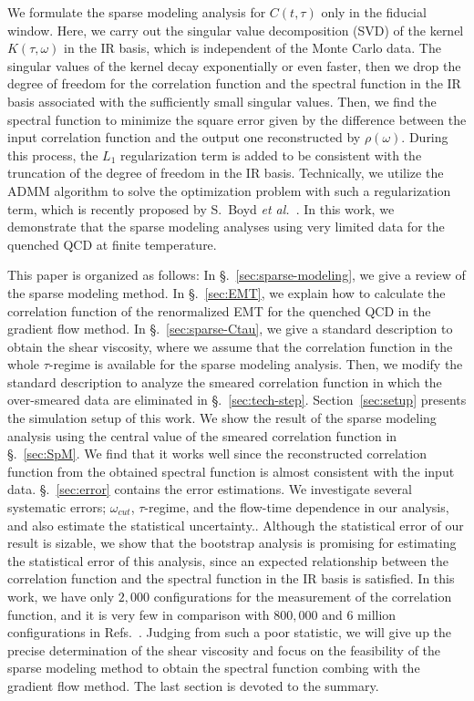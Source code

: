 \documentclass[a4paper,11pt]{article}
\begin{document}
We formulate the sparse modeling analysis for $C(t,\tau)$ only in the fiducial window.  
Here, we carry out  the singular value decomposition (SVD) of the kernel $K(\tau,\omega)$ in the IR basis, which is independent of the Monte Carlo data.
The singular values of the kernel decay exponentially or even faster, then we drop the degree of freedom for the correlation function and the spectral function in the IR basis associated with the sufficiently small singular values.
Then, we find the spectral function to minimize the square error given by the difference between the input correlation function and the output one reconstructed by $\rho(\omega)$.
During this process, the $L_1$ regularization term is added to be consistent with the truncation of the degree of freedom in the IR basis.
Technically, we utilize the ADMM algorithm to solve the optimization problem with such a regularization term, which is recently proposed by  S.~Boyd {\it et al.}~\cite{ADMM1, ADMM2}.
In this work, we demonstrate that the sparse modeling analyses using very limited data  for the quenched QCD at  finite temperature.

 
This paper is organized as follows: 
In \S.~\ref{sec:sparse-modeling}, we give a review of the sparse modeling method. 
In \S.~\ref{sec:EMT}, we explain how to calculate the correlation function of the renormalized EMT for the quenched QCD in the gradient flow method.
 In \S.~\ref{sec:sparse-Ctau}, we give a standard description to obtain the shear viscosity, where we assume that the correlation function in the whole $\tau$-regime is available for the sparse modeling analysis.  
 Then, we modify the standard description to analyze the smeared correlation function in which the over-smeared data are eliminated in \S.~\ref{sec:tech-step}.
Section~\ref{sec:setup} presents the simulation setup of this work.
We show the result of the sparse modeling analysis using the central value of the smeared correlation function in \S.~\ref{sec:SpM}.
We find that it works well since the reconstructed correlation function from the obtained spectral function is almost consistent with the input data.
\S.~\ref{sec:error} contains the error estimations.
We investigate several systematic errors; $\omega_{cut}$, $\tau$-regime, and the flow-time dependence in our analysis, and also estimate the statistical uncertainty..
Although the statistical error of our result is sizable, we show that the bootstrap analysis is promising for estimating the statistical error of this analysis, since an expected relationship between the correlation function and the spectral function in the IR basis is satisfied.
In this work, we have only $2,000$ configurations for the measurement of the correlation function, and it is very few in comparison with $800,000$ and $6$ million configurations in Refs.~\cite{Nakamura:2004sy,Pasztor:2018yae}.
Judging from such a poor statistic, we will give up the precise determination of the shear viscosity and focus on the feasibility of the sparse modeling method to obtain the spectral function combing with the gradient flow method.
The last section is devoted to the summary.
\end{document}
